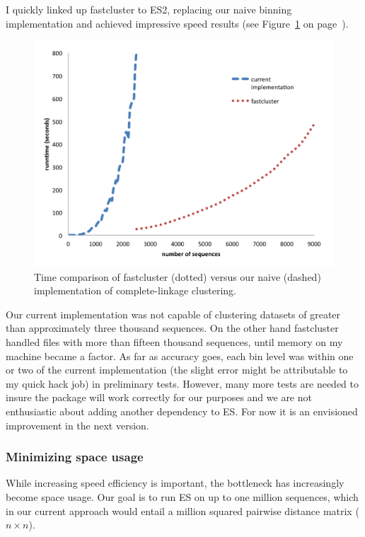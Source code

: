 I quickly linked up fastcluster to ES2, replacing our naive binning implementation and achieved impressive speed results (see Figure~\ref{fig:FastVsNaive} on page~\pageref{fig:FastVsNaive}).
\begin{figure}[h!]
\centering
\includegraphics[scale=.8]{images/FastVsNaive-CH3}
\caption[Time comparison of fastcluster versus our naive implementation of complete-linkage clustering.]{Time comparison of fastcluster (dotted) versus our naive (dashed) implementation of complete-linkage clustering.}
\label{fig:FastVsNaive}
\end{figure}
Our current implementation was not capable of clustering datasets of greater than approximately three thousand sequences.
On the other hand fastcluster handled files with more than fifteen thousand sequences, until memory on my machine became a factor.
As far as accuracy goes, each bin level was within one or two of the current implementation (the slight error might be attributable to my quick hack job) in preliminary tests.
However, many more tests are needed to insure the package will work correctly for our purposes and we are not enthusiastic about adding another dependency to ES.
For now it is an envisioned improvement in the next version.

\subsubsection*{Minimizing space usage}
While increasing speed efficiency is important, the bottleneck has increasingly become space usage.
Our goal is to run ES on up to one million sequences, which in our current approach would entail a million squared pairwise distance matrix ($n \times n$).

